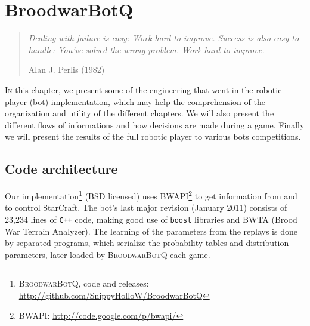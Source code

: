\chapter{BroodwarBotQ}%
\label{chapter:bot}



\begin{quotation}
\textit{Dealing with failure is easy: Work hard to improve. Success is also easy to handle: You've solved the wrong problem. Work hard to improve.}\\
\begin{flushright}Alan J. Perlis (1982)\end{flushright}
\end{quotation}

\lettrine{I}{n} this chapter, we present some of the engineering that went in the robotic player (bot) implementation, which may help the comprehension of the organization and utility of the different chapters. We will also present the different flows of informations and how decisions are made during a game. Finally we will present the results of the full robotic player to various bots competitions.




\section{Code architecture}

\label{sec:codearchitecture}

Our implementation\footnote{\textsc{BroodwarBotQ}, code and releases: \url{http://github.com/SnippyHolloW/BroodwarBotQ}} (BSD licensed) uses BWAPI\footnote{BWAPI: \url{http://code.google.com/p/bwapi/}} to get information from and to control StarCraft. The bot's last major revision (January 2011) consists of 23,234 lines of \texttt{C++} code, making good use of \texttt{boost} libraries and BWTA (Brood War Terrain Analyzer). The learning of the parameters from the replays is done by separated programs, which serialize the probability tables and distribution parameters, later loaded by \textsc{BroodwarBotQ} each game.


